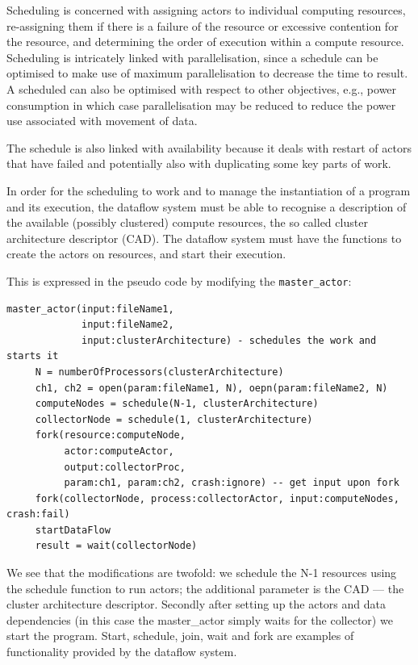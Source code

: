 \documentclass[11pt,a4paper]{article}
\begin{document}
Scheduling is concerned with assigning actors to individual computing
resources, re-assigning them if there is a failure of the resource or
excessive contention for the resource, and determining the order of
execution within a compute resource. Scheduling is intricately linked
with parallelisation, since a schedule can be optimised to make use of
maximum parallelisation to decrease the time to result. A scheduled
can also be optimised with respect to other objectives, e.g., power
consumption in which case parallelisation may be reduced to reduce the
power use associated with movement of data. 

The schedule is also linked with availability because it deals with
restart of actors that have failed and potentially also with
duplicating some key parts of work.

In order for the scheduling to work and to manage the instantiation of
a program and its execution, the dataflow system must be able to
recognise a description of the available (possibly clustered) compute
resources, the so called cluster architecture descriptor (CAD).  The
dataflow system must have the functions to create the actors on
resources, and start their execution.

\begin{Example}

This is expressed in the pseudo code by modifying the {\tt master\_actor}:

\begin{lstlisting}
master_actor(input:fileName1, 
             input:fileName2, 
             input:clusterArchitecture) - schedules the work and starts it
     N = numberOfProcessors(clusterArchitecture)
     ch1, ch2 = open(param:fileName1, N), oepn(param:fileName2, N)
     computeNodes = schedule(N-1, clusterArchitecture)
     collectorNode = schedule(1, clusterArchitecture)
     fork(resource:computeNode, 
          actor:computeActor, 
          output:collectorProc,
          param:ch1, param:ch2, crash:ignore) -- get input upon fork
     fork(collectorNode, process:collectorActor, input:computeNodes, crash:fail)
     startDataFlow
     result = wait(collectorNode)
\end{lstlisting}

We see that the modifications are twofold: we schedule the N-1
resources using the schedule function to run actors; the additional
parameter is the CAD --- the cluster architecture descriptor.
Secondly after setting up the actors and data dependencies (in this
case the master\_actor simply waits for the collector) we start the
program.  Start, schedule, join, wait and fork are examples of
functionality provided by the dataflow system.

\end{Example}
\end{document}

